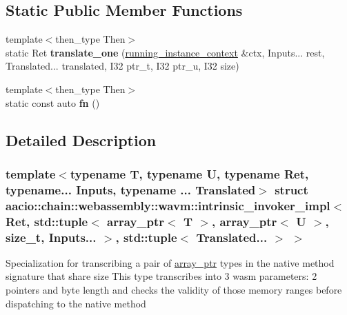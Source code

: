 \subsection*{Static Public Member Functions}
\begin{DoxyCompactItemize}
\item 
\mbox{\label{structaacio_1_1chain_1_1webassembly_1_1wavm_1_1intrinsic__invoker__impl_3_01_ret_00_01std_1_1tup57488daa8dd7568bbd75b88a50d7b22c_ac4ef965f92ce7d66febddbe6ee5e8b25}} 
{\footnotesize template$<$then\+\_\+type Then$>$ }\\static Ret {\bfseries translate\+\_\+one} (\mbox{\hyperlink{structaacio_1_1chain_1_1webassembly_1_1wavm_1_1running__instance__context}{running\+\_\+instance\+\_\+context}} \&ctx, Inputs... rest, Translated... translated, I32 ptr\+\_\+t, I32 ptr\+\_\+u, I32 size)
\item 
\mbox{\label{structaacio_1_1chain_1_1webassembly_1_1wavm_1_1intrinsic__invoker__impl_3_01_ret_00_01std_1_1tup57488daa8dd7568bbd75b88a50d7b22c_a474f40cc778f3e2fa18f7b0439380504}} 
{\footnotesize template$<$then\+\_\+type Then$>$ }\\static const auto {\bfseries fn} ()
\end{DoxyCompactItemize}


\subsection{Detailed Description}
\subsubsection*{template$<$typename T, typename U, typename Ret, typename... Inputs, typename ... Translated$>$\newline
struct aacio\+::chain\+::webassembly\+::wavm\+::intrinsic\+\_\+invoker\+\_\+impl$<$ Ret, std\+::tuple$<$ array\+\_\+ptr$<$ T $>$, array\+\_\+ptr$<$ U $>$, size\+\_\+t, Inputs... $>$, std\+::tuple$<$ Translated... $>$ $>$}

Specialization for transcribing a pair of \mbox{\hyperlink{structaacio_1_1chain_1_1array__ptr}{array\+\_\+ptr}} types in the native method signature that share size This type transcribes into 3 wasm parameters\+: 2 pointers and byte length and checks the validity of those memory ranges before dispatching to the native method


